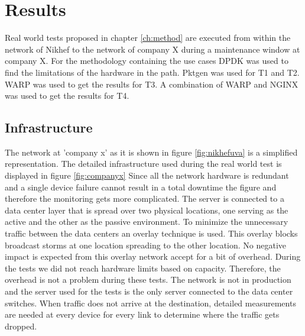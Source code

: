 \chapter{Results}\label{ch:results}

Real world tests proposed in chapter \ref{ch:method} are executed from within the network of Nikhef to the network of company X during a maintenance window at company X.
For the methodology containing the use cases DPDK was used to find the limitations of the hardware in the path. 
Pktgen was used for T1 and T2. WARP was used to get the results for T3.
A combination of WARP and NGINX was used to get the results for T4. 


\section{Infrastructure}
The network at 'company x' as it is shown in figure \ref{fig:nikhefuva} is a simplified representation.
The detailed infrastructure used during the real world test is displayed in figure \ref{fig:companyx} 
Since all the network hardware is redundant and a single device failure cannot result in a total downtime the figure and therefore the monitoring gets more complicated.
The server is connected to a data center layer that is spread over two physical locations, one serving as the active and the other as the passive environment.
To minimize the unnecessary traffic between the data centers an overlay technique is used. This overlay blocks broadcast storms at one location spreading to the other location.
No negative impact is expected from this overlay network accept for a bit of overhead. 
During the tests we did not reach hardware limits based on capacity. 
Therefore, the overhead is not a problem during these tests.  
The network is not in production and the server used for the tests is the only server connected to the data center switches.     
When traffic does not arrive at the destination, detailed measurements are needed at every device for every link to determine where the traffic gets dropped.   

